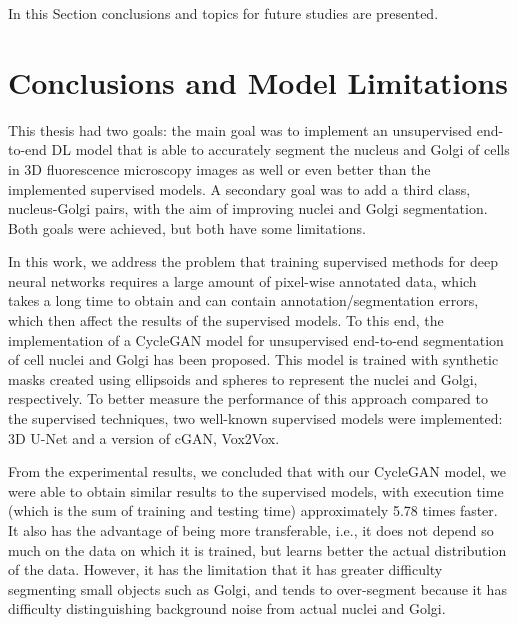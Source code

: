\label{chap:conclusion}

In this Section conclusions and topics for future studies are presented.
\section{Conclusions and Model Limitations}

This thesis had two goals: the main goal was to implement an unsupervised end-to-end \ac{DL} model that is able to accurately segment the nucleus and Golgi of cells in \ac{3D} fluorescence microscopy images as well or even better than the implemented supervised models. A secondary goal was to add a third class, nucleus-Golgi pairs, with the aim of improving nuclei and Golgi segmentation. Both goals were achieved, but both have some limitations.

In this work, we address the problem that training supervised methods for deep neural networks requires a large amount of pixel-wise annotated data, which takes a long time to obtain and can contain annotation/segmentation errors, which then affect the results of the supervised models. To this end, the implementation of a CycleGAN model for unsupervised end-to-end segmentation of cell nuclei and Golgi has been proposed. This model is trained with synthetic masks created using ellipsoids and spheres to represent the nuclei and Golgi, respectively. To better measure the performance of this approach compared to the supervised techniques, two well-known supervised models were implemented: \ac{3D} U-Net and a version of \ac{cGAN}, Vox2Vox. 

From the experimental results, we concluded that with our CycleGAN model, we were able to obtain similar results to the supervised models, with execution time (which is the sum of training and testing time) approximately 5.78 times faster. It also has the advantage of being more transferable, i.e., it does not depend so much on the data on which it is trained, but learns better the actual distribution of the data. However, it has the limitation that it has greater difficulty segmenting small objects such as Golgi, and tends to over-segment because it has difficulty distinguishing background noise from actual nuclei and Golgi.

